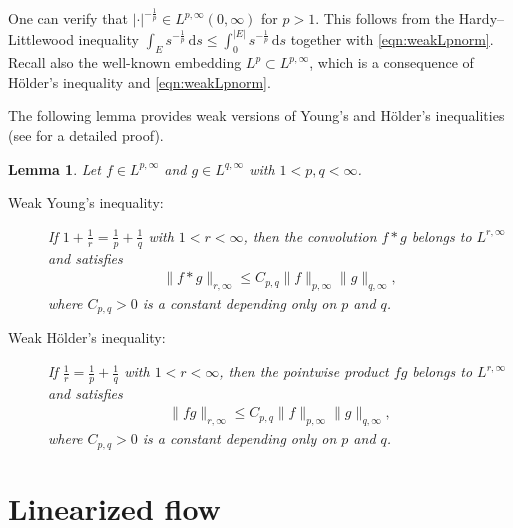 \documentclass[10pt]{amsart}
\theoremstyle{plain}
\newtheorem{lemma}{Lemma}[section]
\theoremstyle{definition}
\theoremstyle{remark}
\numberwithin{equation}{section}
\begin{document}
One can verify that $|\cdot|^{-\frac{1}{p}} \in L^{p,\infty}(0,\infty)$ for $p>1$. This follows from the Hardy--Littlewood inequality $\int_E s^{-\frac{1}{p}} \, \mathrm{d}s \le \int_0^{|E|} s^{-\frac{1}{p}} \, \mathrm{d}s$ together with \cref{eqn:weakLpnorm}.
Recall also the well-known embedding $L^p \subset L^{p,\infty}$, which is a consequence of H\"older's inequality and \cref{eqn:weakLpnorm}.

The following lemma provides weak versions of Young's and H\"older's inequalities (see  \cite[Lemma 2.2]{BorchersMiyakawa92} for a detailed proof).

\begin{lemma} 
Let $f\in L^{p,\infty}$ and $g\in L^{q,\infty}$ with $1<p,q<\infty$.
{
\renewcommand{\descriptionlabel}[1]{\emph{#1}}
\begin{description}
\item[Weak Young's inequality:] If $1+\frac{1}{r}=\frac{1}{p}+\frac{1}{q}$ with $1<r<\infty$, then the convolution $f\ast g$ belongs to $L^{r,\infty}$ and satisfies
\begin{align}\label{eqn:Youngineq}
\|f \ast g\|_{r,\infty} \le C_{p,q} \|f\|_{p,\infty} \|g\|_{q,\infty},
\end{align}
where $C_{p,q}>0$ is a constant depending only on $p$ and $q$.

\item[Weak H\"older's inequality:] If $\frac{1}{r}=\frac{1}{p}+\frac{1}{q}$ with $1<r<\infty$, then the pointwise product $fg$ belongs to $L^{r,\infty}$ and satisfies
\begin{align}\label{eqn:Holderineq}
\|fg\|_{r,\infty} \le C_{p,q} \|f\|_{p,\infty} \|g\|_{q,\infty},
\end{align}
where $C_{p,q}>0$ is a constant depending only on $p$ and $q$.
\end{description}
}
\end{lemma}



\section{Linearized flow}
\label{sec:linear}
\end{document}
